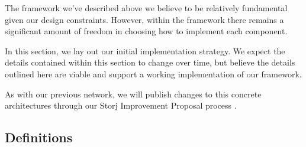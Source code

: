 \documentclass[a4paper,10pt]{article} \usepackage[utf8]{inputenc}
\begin{document}
The framework we've described above we believe to be relatively fundamental
given our design constraints. However, within the framework there remains a
significant amount of freedom in choosing how to implement each component.

In this section, we lay out our initial implementation strategy. We expect
the details contained within this section to change over time, but believe the
details outlined here are viable and support a working implementation of our
framework.

As with our previous network, we will publish changes to this concrete
architectures through our Storj Improvement Proposal process \cite{sips}.

\subsection{Definitions}
\end{document}
